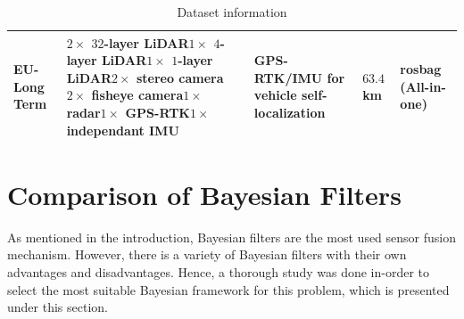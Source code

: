\begin{table}[htp]
\begin{tabular}{ |p{}|p{}|p{}|p{}|p{}|  }
	\hline
	EU-Long Term & $2\times$ $32$-layer LiDAR\newline $1\times$ $4$-layer LiDAR\newline $1\times$ $1$-layer LiDAR\newline $2\times$ stereo camera \newline $2\times$ fisheye camera\newline $1\times$ radar\newline $1\times$ GPS-RTK\newline $1\times$ independant IMU\newline & GPS-RTK/IMU for vehicle self-localization & $63.4$ km & rosbag (All-in-one)\\
	\hline
\end{tabular}
\caption{Dataset information}
\label{table:pa:Datasets}
\vspace{0.5cm}
\end{table}








\section{Comparison of Bayesian Filters}
As mentioned in the introduction, Bayesian filters are the most used sensor fusion mechanism. However, there is a variety of Bayesian filters with their own advantages and disadvantages. Hence, a thorough study was done in-order to select the most suitable Bayesian framework for this problem, which is presented under this section.

